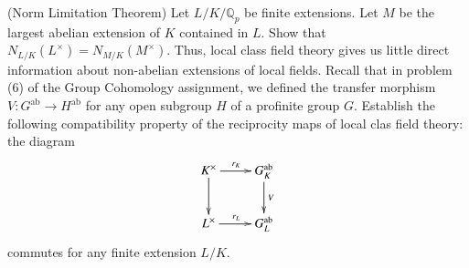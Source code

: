 \documentclass[11pt,answers,addpoints,reqno]{exam}
\theoremstyle{definition}
\theoremstyle{remark}
\theoremstyle{definition}
\theoremstyle{remark}
\theoremstyle{remark}
\newcommand{\Q}{\mathbb{Q}}
\newcommand{\mr}{\mathrm}
\begin{document}
\begin{questions}
\question (Norm Limitation Theorem) Let $L/K/\Q_p$ be finite extensions. Let $M$
be the largest abelian extension of $K$ contained in $L$. Show that $N_{L/K}(L^\times)= N_{M/K}(M^{\times})$. Thus, local class field theory gives us little direct information about non-abelian extensions of local fields.
\question \label{Ver} Recall that in problem (6) of the Group Cohomology
assignment, we defined the transfer morphism $V \colon G^{\mr{ab}} \to H^{\mr{ab}}$ for any open subgroup $H$ of a profinite group $G$. Establish the following compatibility property of the reciprocity maps of local clas field theory: the diagram
\[
 \xymatrix{
K^\times \ar[r]^{r_K} \ar[d] & G_K^{\mr{ab}}\ar[d]^V \\
L^\times \ar[r]^{r_L} & G_L^{\mr{ab}}
}
\]
commutes for any finite extension $L/K$.
\end{questions}
\end{document}
